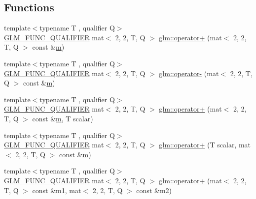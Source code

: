 \subsection*{Functions}
\begin{DoxyCompactItemize}
\item 
{\footnotesize template$<$typename T , qualifier Q$>$ }\\\hyperlink{setup_8hpp_a33fdea6f91c5f834105f7415e2a64407}{G\+L\+M\+\_\+\+F\+U\+N\+C\+\_\+\+Q\+U\+A\+L\+I\+F\+I\+ER} mat$<$ 2, 2, T, Q $>$ \hyperlink{namespaceglm_ae58da6d122dbd410537502ee0a16f9cd}{glm\+::operator+} (mat$<$ 2, 2, T, Q $>$ const \&\hyperlink{_s_d_l__opengl__glext_8h_af593500c283bf1a787a6f947f503a5c2}{m})
\item 
{\footnotesize template$<$typename T , qualifier Q$>$ }\\\hyperlink{setup_8hpp_a33fdea6f91c5f834105f7415e2a64407}{G\+L\+M\+\_\+\+F\+U\+N\+C\+\_\+\+Q\+U\+A\+L\+I\+F\+I\+ER} mat$<$ 2, 2, T, Q $>$ \hyperlink{namespaceglm_a44be44a2be57ea0295081bec73df8f71}{glm\+::operator-\/} (mat$<$ 2, 2, T, Q $>$ const \&\hyperlink{_s_d_l__opengl__glext_8h_af593500c283bf1a787a6f947f503a5c2}{m})
\item 
{\footnotesize template$<$typename T , qualifier Q$>$ }\\\hyperlink{setup_8hpp_a33fdea6f91c5f834105f7415e2a64407}{G\+L\+M\+\_\+\+F\+U\+N\+C\+\_\+\+Q\+U\+A\+L\+I\+F\+I\+ER} mat$<$ 2, 2, T, Q $>$ \hyperlink{namespaceglm_a4985946dcd4a32193f3471a54a6bde94}{glm\+::operator+} (mat$<$ 2, 2, T, Q $>$ const \&\hyperlink{_s_d_l__opengl__glext_8h_af593500c283bf1a787a6f947f503a5c2}{m}, T scalar)
\item 
{\footnotesize template$<$typename T , qualifier Q$>$ }\\\hyperlink{setup_8hpp_a33fdea6f91c5f834105f7415e2a64407}{G\+L\+M\+\_\+\+F\+U\+N\+C\+\_\+\+Q\+U\+A\+L\+I\+F\+I\+ER} mat$<$ 2, 2, T, Q $>$ \hyperlink{namespaceglm_ae044e0d44472e5ce496c101a346995fa}{glm\+::operator+} (T scalar, mat$<$ 2, 2, T, Q $>$ const \&\hyperlink{_s_d_l__opengl__glext_8h_af593500c283bf1a787a6f947f503a5c2}{m})
\item 
{\footnotesize template$<$typename T , qualifier Q$>$ }\\\hyperlink{setup_8hpp_a33fdea6f91c5f834105f7415e2a64407}{G\+L\+M\+\_\+\+F\+U\+N\+C\+\_\+\+Q\+U\+A\+L\+I\+F\+I\+ER} mat$<$ 2, 2, T, Q $>$ \hyperlink{namespaceglm_af64684c1a1aba33f75b3bb9e116df931}{glm\+::operator+} (mat$<$ 2, 2, T, Q $>$ const \&m1, mat$<$ 2, 2, T, Q $>$ const \&m2)
\item 

\end{DoxyCompactItemize}
